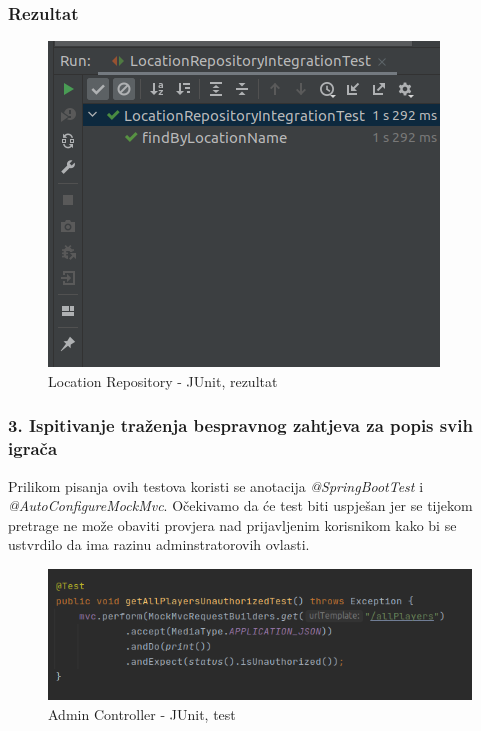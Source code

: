 				\subsubsection{Rezultat}
				
						\begin{figure}[H]
							\includegraphics[width=\textwidth]{slike/locationFindByNameTest_result} 
							\centering
							\caption{Location Repository - JUnit, rezultat}
							\label{}
						\end{figure}
					
				\subsubsection {3. Ispitivanje traženja bespravnog zahtjeva za popis svih igrača}
					
					{Prilikom pisanja ovih testova koristi se anotacija \textit{@SpringBootTest} i \textit{@AutoConfigureMockMvc}. Očekivamo da će test biti uspješan jer se tijekom pretrage ne može obaviti provjera nad prijavljenim korisnikom kako bi se ustvrdilo da ima razinu adminstratorovih ovlasti.}
					
						\begin{figure}[H]
							\includegraphics[width=\textwidth]{slike/unauthorizedTest} 
							\centering
							\caption{Admin Controller - JUnit, test}
							\label{}
						\end{figure}
					
